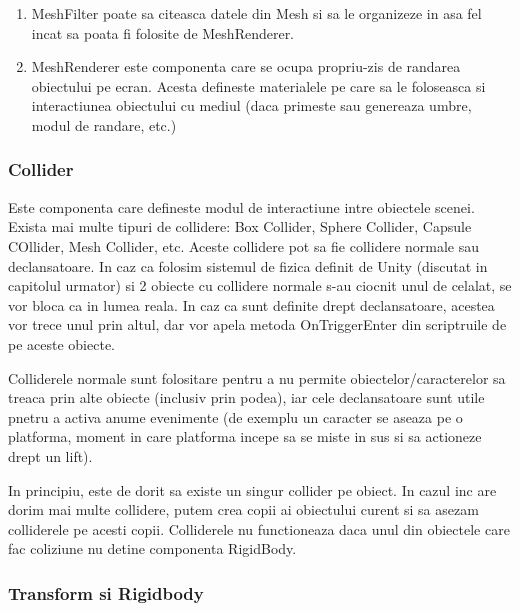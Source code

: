 \documentclass[12pt, a4paper]{article}
\begin{document}
	\begin{enumerate}
		\item MeshFilter poate sa citeasca datele din Mesh si sa le organizeze in asa fel incat sa poata fi folosite de MeshRenderer.
		\item MeshRenderer este componenta care se ocupa propriu-zis de randarea obiectului pe ecran. Acesta defineste materialele pe care sa le foloseasca si interactiunea obiectului cu mediul (daca primeste sau genereaza umbre, modul de randare, etc.)
	\end{enumerate}
	
	
	
	
	
	\subsubsection{Collider}
	
	Este componenta care defineste modul de interactiune intre obiectele scenei. Exista mai multe tipuri de collidere: Box Collider, Sphere Collider, Capsule COllider, Mesh Collider, etc. Aceste collidere pot sa fie collidere normale sau declansatoare. In caz ca folosim sistemul de fizica definit de Unity (discutat in capitolul urmator) si 2 obiecte cu collidere normale s-au ciocnit unul de celalat, se vor bloca ca in lumea reala. In caz ca sunt definite drept declansatoare, acestea vor trece unul prin altul, dar vor apela metoda OnTriggerEnter din scriptruile de pe aceste obiecte.
	\newline
	
	Colliderele normale sunt folositare pentru a nu permite obiectelor/caracterelor sa treaca prin alte obiecte (inclusiv prin podea), iar cele declansatoare sunt utile pnetru a activa anume evenimente (de exemplu un caracter se aseaza pe o platforma, moment in care platforma incepe sa se miste in sus si sa actioneze drept un lift).
	\newline
	
	In principiu, este de dorit sa existe un singur collider pe obiect. In cazul inc are dorim mai multe collidere, putem crea copii ai obiectului curent si sa asezam colliderele pe acesti copii. Colliderele nu functioneaza daca unul din obiectele care fac coliziune nu detine componenta RigidBody.
	
	
	
	
	\subsubsection{Transform si Rigidbody}
	
\end{document}
